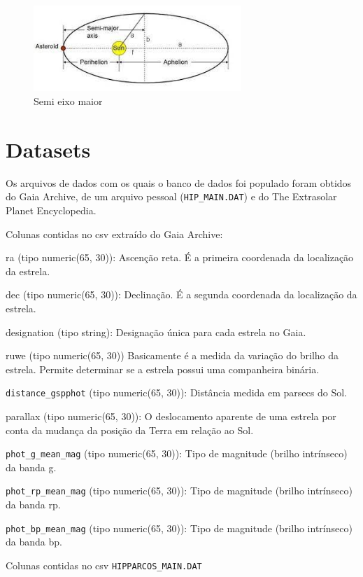 \documentclass[12pt, a4paper]{article}
\begin{document}
	\begin{figure}[H]
		\centering
		\includegraphics[width=0.7\textwidth]{semi_major_axis.png}
		\caption{Semi eixo maior}
	\end{figure}

	\section{Datasets}
	
	Os arquivos de dados com os quais o banco de dados foi populado foram obtidos do Gaia Archive, de um arquivo pessoal (\verb|HIP_MAIN.DAT|) e do The Extrasolar Planet Encyclopedia.
	
	Colunas contidas no csv extraído do Gaia Archive:
	
	ra (tipo numeric(65, 30)):
	Ascenção reta. É a primeira coordenada da localização da estrela.
	
	dec (tipo numeric(65, 30)):
	Declinação. É a segunda coordenada da localização da estrela.
	
	designation (tipo string): 
	Designação única para cada estrela no Gaia.
	
	ruwe (tipo numeric(65, 30))
	Basicamente é a medida da variação do brilho da estrela. Permite determinar se a estrela possui uma companheira binária.
	
	\verb|distance_gspphot| (tipo numeric(65, 30)):
	Distância medida em parsecs do Sol.
	
	parallax (tipo numeric(65, 30)):
	O deslocamento aparente de uma estrela por conta da mudança da posição da Terra em relação ao Sol.
	
	\verb|phot_g_mean_mag| (tipo numeric(65, 30)):
	Tipo de magnitude (brilho intrínseco) da banda g.
	
	\verb|phot_rp_mean_mag| (tipo numeric(65, 30)):
	Tipo de magnitude (brilho intrínseco) da banda rp.
	
	\verb|phot_bp_mean_mag| (tipo numeric(65, 30)):
	Tipo de magnitude (brilho intrínseco) da banda bp.
	
	Colunas contidas no csv \verb|HIPPARCOS_MAIN.DAT|
	
\end{document}

